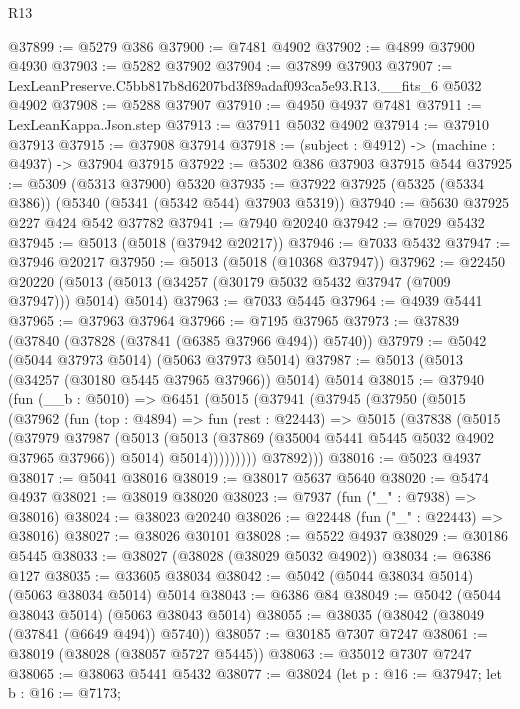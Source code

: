 \begin{lexlean}{R13}
\begin{coremodule}
@37899 := @5279 @386
@37900 := @7481 @4902
@37902 := @4899 @37900 @4930
@37903 := @5282 @37902
@37904 := @37899 @37903
@37907 := LexLeanPreserve.C5bb817b8d6207bd3f89adaf093ca5e93.R13.__fits_6 @5032 @4902
@37908 := @5288 @37907
@37910 := @4950 @4937 @7481
@37911 := LexLeanKappa.Json.step
@37913 := @37911 @5032 @4902
@37914 := @37910 @37913
@37915 := @37908 @37914
@37918 := (subject : @4912) -> (machine : @4937) -> @37904 @37915
@37922 := @5302 @386 @37903 @37915 @544
@37925 := @5309 (@5313 @37900) @5320
@37935 := @37922 @37925 (@5325 (@5334 @386)) (@5340 (@5341 (@5342 @544) @37903 @5319))
@37940 := @5630 @37925 @227 @424 @542 @37782
@37941 := @7940 @20240
@37942 := @7029 @5432
@37945 := @5013 (@5018 (@37942 @20217))
@37946 := @7033 @5432
@37947 := @37946 @20217
@37950 := @5013 (@5018 (@10368 @37947))
@37962 := @22450
    @20220
    (@5013 (@5013 (@34257 (@30179 @5032 @5432 @37947 (@7009 @37947))) @5014) @5014)
@37963 := @7033 @5445
@37964 := @4939 @5441
@37965 := @37963 @37964
@37966 := @7195 @37965
@37973 := @37839 (@37840 (@37828 (@37841 (@6385 @37966 @494)) @5740))
@37979 := @5042 (@5044 @37973 @5014) (@5063 @37973 @5014)
@37987 := @5013 (@5013 (@34257 (@30180 @5445 @37965 @37966)) @5014) @5014
@38015 := @37940
    (fun (__b : @5010) =>
    @6451
      (@5015
        (@37941
          (@37945
            (@37950
              (@5015
                (@37962
                  (fun (top : @4894) =>
                  fun (rest : @22443) =>
                  @5015
                    (@37838
                      (@5015
                        (@37979
                          @37987
                          (@5013
                            (@5013 (@37869 (@35004 @5441 @5445 @5032 @4902 @37965 @37966)) @5014)
                            @5014)))))))))
          @37892)))
@38016 := @5023 @4937
@38017 := @5041 @38016
@38019 := @38017 @5637 @5640
@38020 := @5474 @4937
@38021 := @38019 @38020
@38023 := @7937 (fun ("_" : @7938) => @38016)
@38024 := @38023 @20240
@38026 := @22448 (fun ("_" : @22443) => @38016)
@38027 := @38026 @30101
@38028 := @5522 @4937
@38029 := @30186 @5445
@38033 := @38027 (@38028 (@38029 @5032 @4902))
@38034 := @6386 @127
@38035 := @33605 @38034
@38042 := @5042 (@5044 @38034 @5014) (@5063 @38034 @5014) @5014
@38043 := @6386 @84
@38049 := @5042 (@5044 @38043 @5014) (@5063 @38043 @5014)
@38055 := @38035 (@38042 (@38049 (@37841 (@6649 @494)) @5740))
@38057 := @30185 @7307 @7247
@38061 := @38019 (@38028 (@38057 @5727 @5445))
@38063 := @35012 @7307 @7247
@38065 := @38063 @5441 @5432
@38077 := @38024
    (let p : @16 := @37947;
    let b : @16 := @7173;

\end{coremodule}
\end{lexlean}
